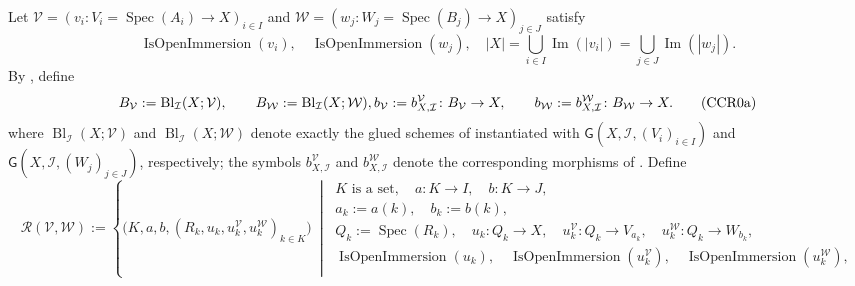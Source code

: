 \begin{definition}
  \label{def:nagata-global-blowup-cover-comparison}

  Let
  \(\mathcal V=(v_i\colon V_i=\operatorname{Spec}(A_i)\to X)_{i\in I}\)
  and
  \(\mathcal W=(w_j\colon W_j=\operatorname{Spec}(B_j)\to X)_{j\in J}\)
  satisfy
  \[
    \operatorname{IsOpenImmersion}(v_i),\quad
    \operatorname{IsOpenImmersion}(w_j),\quad
    |X|=\bigcup_{i\in I}\operatorname{Im}(|v_i|)
       =\bigcup_{j\in J}\operatorname{Im}(|w_j|).                  \tag{CCR0}
  \]
  By ,
  define
  \[
    B_{\mathcal V}:=
      \operatorname{Bl}_{\mathcal I}(X;\mathcal V),\qquad
    B_{\mathcal W}:=
      \operatorname{Bl}_{\mathcal I}(X;\mathcal W),\\
    b_{\mathcal V}:=b_{X,\mathcal I}^{\mathcal V}
      \colon B_{\mathcal V}\to X,\qquad
    b_{\mathcal W}:=b_{X,\mathcal I}^{\mathcal W}
      \colon B_{\mathcal W}\to X.                               \tag{CCR0a}
  \]
  where
  $\operatorname{Bl}_{\mathcal I}(X;\mathcal V)$ and
  $\operatorname{Bl}_{\mathcal I}(X;\mathcal W)$ denote exactly the glued
  schemes of  instantiated with
  $\mathsf G(X,\mathcal I,(V_i)_{i\in I})$ and
  $\mathsf G(X,\mathcal I,(W_j)_{j\in J})$, respectively; the symbols
  $b_{X,\mathcal I}^{\mathcal V}$ and
  $b_{X,\mathcal I}^{\mathcal W}$ denote the corresponding morphisms of
  .
  Define
  \[
    \mathscr R(\mathcal V,\mathcal W):=
    \left\{\bigl(K,a,b,(R_k,u_k,u_k^{\mathcal V},
        u_k^{\mathcal W})_{k\in K}\bigr)\ \middle|\
    \begin{array}{l}
      K\text{ is a set},\quad a\colon K\to I,\quad b\colon K\to J,\\
      a_k:=a(k),\quad b_k:=b(k),\\
      Q_k:=\operatorname{Spec}(R_k),\quad
      u_k\colon Q_k\to X,\quad
      u_k^{\mathcal V}\colon Q_k\to V_{a_k},\quad
      u_k^{\mathcal W}\colon Q_k\to W_{b_k},\\
      \operatorname{IsOpenImmersion}(u_k),\quad
      \operatorname{IsOpenImmersion}(u_k^{\mathcal V}),\quad
      \operatorname{IsOpenImmersion}(u_k^{\mathcal W}),\\

\end{array}\]
\end{definition}
